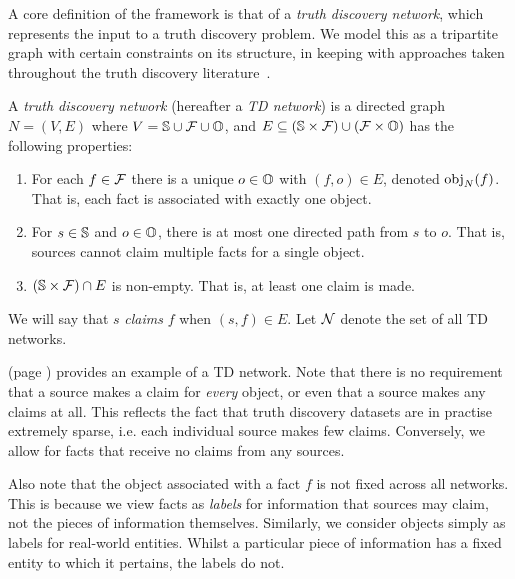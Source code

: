 A core definition of the framework is that of a \emph{truth discovery network},
which represents the input to a truth discovery problem. We model this as a
tripartite graph with certain constraints on its structure, in keeping with
approaches taken throughout the truth discovery
literature~\cite{yin2008,gupta2011survey}.

\begin{definition}
\label{def_td_network}
A \emph{truth discovery network} (hereafter a {\em TD network}) is a directed
graph $N = (V, E)$ where $V = \S \cup \F \cup \O$, and $E \subseteq (\S \times
\F) \cup (\F \times \O)$ has the following properties:

\begin{enumerate}
\item For each $f \in \F$ there is a unique $o \in \O$ with $(f, o) \in
E$, denoted $\obj_N(f)$. That is, each fact is associated with exactly one
object.

\item For $s \in \S$ and $o \in \O$, there is at most one directed path from
$s$ to $o$. That is, sources cannot claim multiple facts for a single object.

\item $(\S \times \F) \cap E$ is non-empty. That is, at least one claim is
made.

\end{enumerate}
We will say that $s$ \emph{claims} $f$ when $(s, f) \in E$. Let $\N$ denote the
set of all TD networks.
\end{definition}

 (page \pageref{td_fig_intro_example}) provides an example
of a TD network.  Note that there is no requirement that a source makes a claim
for \emph{every} object, or even that a source makes any claims at all. This
reflects the fact that truth discovery datasets are in practise extremely
sparse, i.e. each individual source makes few claims. Conversely, we allow for
facts that receive no claims from any sources.

Also note that the object associated with a fact $f$ is not fixed across all
networks. This is because we view facts as \emph{labels} for information that
sources may claim, not the pieces of information themselves. Similarly, we
consider objects simply as labels for real-world entities. Whilst a particular
piece of information has a fixed entity to which it pertains, the labels do
not.\footnotemark{}


